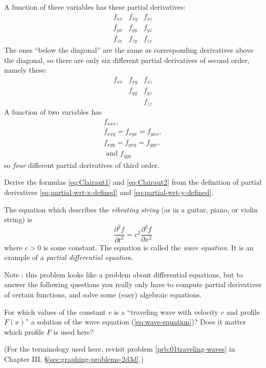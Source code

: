 \begin{multicols}{2}
A function of three variables has these partial derivatives:
\[
  \begin{matrix}
    f_{xx} & f_{xy} & f_{xz} \\
    f_{yx} & f_{yy} & f_{yz} \\
    f_{zx} & f_{zy} & f_{zz}
  \end{matrix}
\]
The ones ``below the diagonal'' are the same as corresponding derivatives
above the diagonal, so there are only six different partial derivatives
of second order, namely these:
\[
  \begin{matrix}
    f_{xx} & f_{xy} & f_{xz} \\
    & f_{yy} & f_{yz} \\
    & & f_{zz}
  \end{matrix}
\]
A function of two variables has 
\begin{gather*}
  f_{xxx}, \\
  f_{xxy}=f_{xyx}=f_{yxx}, \\
  f_{xyy}=f_{yxy}=f_{yyx},\\
  \text{ and } f_{yyy}
\end{gather*}
so \emph{four} different partial derivatives of third order.
\endanswer

\problem Derive the formulas \eqref{eq:Clairaut1} and  
\eqref{eq:Clairaut2} from the definition of partial derivatives
\eqref{eq:partial-wrt-x-defined} and
\eqref{eq:partial-wrt-y-defined}.

\problem The equation which describes the \textit{vibrating  string}  
(as in a guitar, piano, or violin string) is
\begin{equation}\label{eq:wave-equation}
  \frac{\partial^2 f}{\partial t^2} = c^2 \frac{\partial^2 f}{\partial x^2}
\end{equation}
where $c>0$ is some constant. The equation is called the \emph{wave
equation}.  It is an example of a \emph{partial differential equation.}

Note : this problem looks like a problem about differential
equations, but to answer the following questions you really only have
to compute partial derivatives of certain functions, and solve some
(easy) algebraic equations.

\subprob For which values of the constant $v$ is a ``traveling wave
with velocity $v$ and profile $F(x)$'' a solution of the wave equation
(\ref{eq:wave-equation})?  Does it matter which profile $F$ is used
here?

(For the terminology used here, revisit problem
\ref{prb:01traveling-waves} in Chapter III, \S\ref{sec:graphing-problems-2d3d}.)


\end{multicols}

